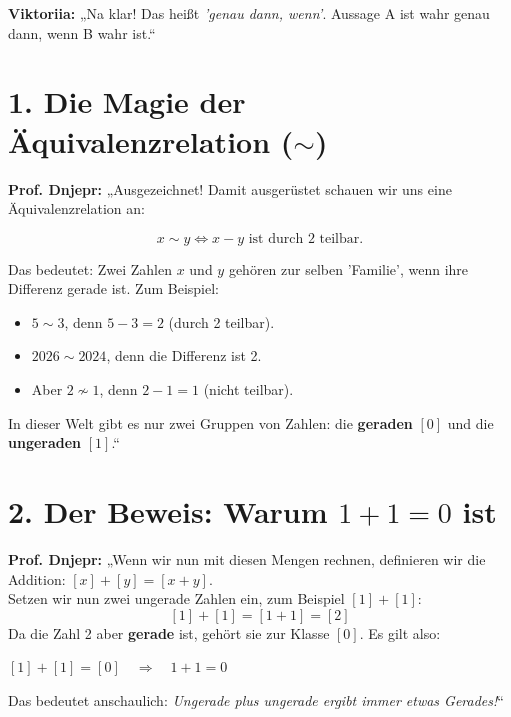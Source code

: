 \documentclass[11pt,a4paper]{article}
\begin{document}
\vspace{2mm}

\noindent \textcolor{kievblue}{\textbf{Viktoriia:}} „Na klar! Das heißt \textit{'genau dann, wenn'}. Aussage A ist wahr genau dann, wenn B wahr ist.“

\section*{\color{darknavy} 1. Die Magie der Äquivalenzrelation ($\sim$)}

\noindent \textcolor{burgundy}{\textbf{Prof. Dnjepr:}} „Ausgezeichnet! Damit ausgerüstet schauen wir uns eine Äquivalenzrelation an:

\[
x \sim y \iff x - y \text{ ist durch 2 teilbar.}
\]

\noindent Das bedeutet: Zwei Zahlen $x$ und $y$ gehören zur selben 'Familie', wenn ihre Differenz gerade ist. Zum Beispiel:
\begin{itemize}
	\item $5 \sim 3$, denn $5 - 3 = 2$ (durch 2 teilbar).
	\item $2026 \sim 2024$, denn die Differenz ist 2.
	\item Aber $2 \not\sim 1$, denn $2 - 1 = 1$ (nicht teilbar).
\end{itemize}
In dieser Welt gibt es nur zwei Gruppen von Zahlen: die \textbf{geraden} $[0]$ und die \textbf{ungeraden} $[1]$.“

\section*{\color{darknavy} 2. Der Beweis: Warum $1 + 1 = 0$ ist}

\noindent \textcolor{burgundy}{\textbf{Prof. Dnjepr:}} „Wenn wir nun mit diesen Mengen rechnen, definieren wir die Addition: $[x] + [y] = [x + y]$.\\
Setzen wir nun zwei ungerade Zahlen ein, zum Beispiel $[1] + [1]$:
\[
[1] + [1] = [1 + 1] = [2]
\]
Da die Zahl 2 aber \textbf{gerade} ist, gehört sie zur Klasse $[0]$. Es gilt also:

\begin{tcolorbox}[colback=yellow!15, colframe=kievyellow, arc=2mm, halign=center]
	{\color{burgundy}\Large \textbf{$[1] + [1] = [0] \quad \Rightarrow \quad 1 + 1 = 0$}}
\end{tcolorbox}

\noindent Das bedeutet anschaulich: \textit{Ungerade plus ungerade ergibt immer etwas Gerades!}“
\end{document}
